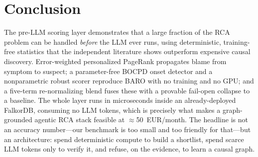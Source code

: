 \documentclass[11pt]{article}
\begin{document}
\section{Conclusion}

The pre-LLM scoring layer demonstrates that a large fraction of the RCA problem
can be handled \emph{before} the LLM ever runs, using deterministic, training-free
statistics that the independent literature shows outperform expensive causal
discovery. Error-weighted personalized PageRank propagates blame from symptom to
suspect; a parameter-free BOCPD onset detector and a nonparametric robust scorer
reproduce BARO with no training and no GPU; and a five-term re-normalizing blend
fuses these with a provable fail-open collapse to a baseline. The whole layer runs
in microseconds inside an already-deployed FalkorDB, consuming no LLM tokens, which
is precisely what makes a graph-grounded agentic RCA stack feasible at
$\approx$50~EUR/month. The headline is not an accuracy number---our benchmark is
too small and too friendly for that---but an architecture: spend deterministic
compute to build a shortlist, spend scarce LLM tokens only to verify it, and
refuse, on the evidence, to learn a causal graph.



\end{document}
